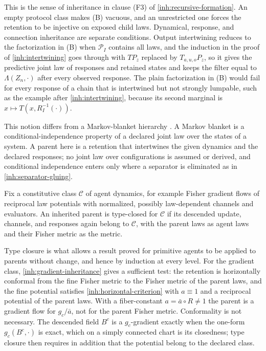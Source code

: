 This is the sense of inheritance in clause (F3) of
\cref{inh:recursive-formation}. An empty protocol class makes (B) vacuous,
and an unrestricted one forces the retention to be injective on exposed
child laws. Dynamical, response, and connection inheritance are separate
conditions. Output intertwining reduces to the factorization in (B) when
$\mathcal P_I$ contains all laws, and the induction in the proof of
\cref{inh:intertwining} goes through with $TP_z$ replaced by
$T_{a,u,o}P_z$, so it gives the predictive joint law of responses and
retained states and keeps the filter equal to $\Lambda(Z_n,\cdot)$ after
every observed response. The plain factorization in (B) would fail for
every response of a chain that is intertwined but not strongly lumpable,
such as the example after \cref{inh:intertwining}, because its second
marginal is $x\mapsto T(x,R_I^{-1}(\cdot))$.

This notion differs from a Markov-blanket hierarchy
\citep{KirchhoffEtAl2018,PalaciosEtAl2020,FristonEtAl2021}. A Markov blanket
is a conditional-independence property of a declared joint law over the
states of a system. A parent here is a retention that intertwines the given
dynamics and the declared responses; no joint law over configurations is
assumed or derived, and conditional independence enters only where a
separator is eliminated as in \cref{inh:separator-gluing}.

Fix a constitutive class $\mathcal C$ of agent dynamics, for example Fisher
gradient flows of reciprocal law potentials with normalized, possibly
law-dependent channels and evaluators. An inherited parent is type-closed
for $\mathcal C$ if its descended update, channels, and responses again
belong to $\mathcal C$, with the parent laws as agent laws and their Fisher
metric as the metric.

Type closure is what allows a result proved for primitive agents to be
applied to parents without change, and hence by induction at every level.
For the gradient class, \cref{inh:gradient-inheritance} gives a sufficient
test: the retention is horizontally conformal from the fine Fisher metric to
the Fisher metric of the parent laws, and the fine potential satisfies
\cref{inh:horizontal-criterion} with $a\equiv1$ and a reciprocal potential
of the parent laws. With a fiber-constant $a=\bar a\circ R\neq1$ the parent
is a gradient flow for $g_c/\bar a$, not for the parent Fisher metric.
Conformality is not necessary. The descended field $B^c$ is a
$g_c$-gradient exactly when the one-form $g_c(B^c,\cdot)$ is exact, which on
a simply connected chart is its closedness; type closure then requires in
addition that the potential belong to the declared class.

